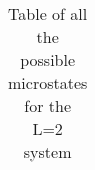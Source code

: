 
\begin{table}[H]
	\caption{Table of all the possible microstates for the L=2 system}
	\label{tab:L2_all}
\begin{tabular}{cccccc}
	
\end{tabular}
\end{table}



